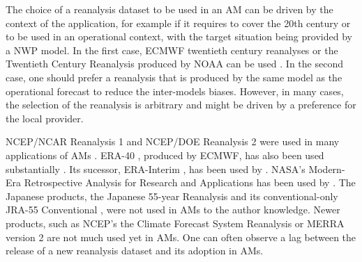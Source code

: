 \documentclass[alpha-refs]{wiley-article}
\begin{document}
The choice of a reanalysis dataset to be used in an AM can be driven by the context of the application, for example if it requires to cover the 20th century or to be used in an operational context, with the target situation being provided by a NWP model. In the first case, ECMWF twentieth century reanalyses \citep[ERA-20C or CERA-20C --][]{Poli2016, Laloyaux2016} or the Twentieth Century Reanalysis \citep[20CR --][]{Compo2011} produced by NOAA can be used \citep[for example,][]{Kuentz2015, Caillouet2016, Brigode2016, Bonnet2017}. In the second case, one should prefer a reanalysis that is produced by the same model as the operational forecast to reduce the inter-models biases. However, in many cases, the selection of the reanalysis is arbitrary and might be driven by a preference for the local provider. 

NCEP/NCAR Reanalysis 1 \citep[NR-1 --][]{Kalnay1996, Kistler2001} and NCEP/DOE Reanalysis 2 \citep[NR-2 --][]{Kanamitsu2002} were used in many applications of AMs \citep{Timbal2003, Bontron2004, Wetterhall2005a, Gangopadhyay2005, Altava-Ortiz2006, Barrera2007, Cannon2007, Matulla2007, Bliefernicht2007, Maurer2008, BenDaoud2009, Wu2012, Marty2012, Teng2012, Horton2012, Yiou2014}. ERA-40 \citep{Uppala2005}, produced by ECMWF, has also been used substantially \citep {BenDaoud2009, Willems2011b, JakobThemessl2011a, BenDaoud2011, Turco2011a, Franke2011, Pascual2012b, Schenk2012, Ribalaygua2013a, Osca2013, Radanovics2013, Martin2014b, Chardon2014, BenDaoud2016}. Its sucessor, ERA-Interim \citep[ERA-INT --][]{Dee2011a}, has been used by \cite{Raynaud2016b}. NASA's Modern-Era Retrospective Analysis for Research and Applications \citep[MERRA -- ][]{Rienecker2011} has been used by \citet{Vanvyve2015}. The Japanese products, the Japanese 55-year Reanalysis \citep[JRA-55 --][]{Kobayashi2015, Harada2016} and its conventional-only JRA-55 Conventional \citep[JRA-55C --][]{Kobayashi2014}, were not used in AMs to the author knowledge. Newer products, such as NCEP's the Climate Forecast System Reanalysis \citep[CFSR --][]{Saha2010a} or MERRA version 2 \citep[MERRA-2 -- ][]{Gelaro2017} are not much used yet in AMs. One can often observe a lag between the release of a new reanalysis dataset and its adoption in AMs.
\end{document}
